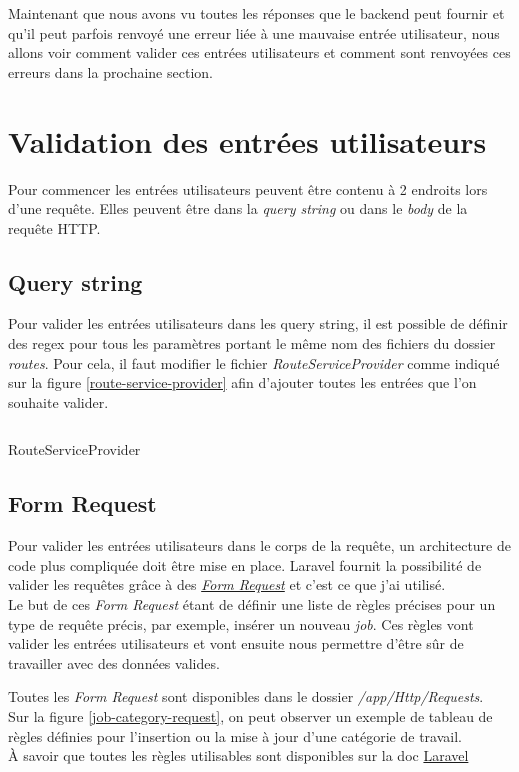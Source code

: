 \documentclass[
    iai, %
    il, %
]{heig-tb}
\begin{document}
Maintenant que nous avons vu toutes les réponses que le \Gls{backend} peut fournir et qu'il peut parfois renvoyé une erreur liée à une mauvaise entrée utilisateur, nous allons voir comment valider ces entrées utilisateurs et comment sont renvoyées ces erreurs dans la prochaine section.

\section{Validation des entrées utilisateurs}
Pour commencer les entrées utilisateurs peuvent être contenu à 2 endroits lors d'une requête. Elles peuvent être dans la \emph{query string} ou dans le \emph{body} de la requête HTTP.

\subsection{Query string}
Pour valider les entrées utilisateurs dans les query string, il est possible de définir des \Gls{regex} pour tous les paramètres portant le même nom des fichiers du dossier \emph{routes}.
Pour cela, il faut modifier le fichier \emph{RouteServiceProvider} comme indiqué sur la figure \ref{route-service-provider} afin d'ajouter toutes les entrées que l'on souhaite valider.

\begin{listing}[h]
    \inputminted{php}{assets/code/RouteServiceProvider.php}
    \caption{RouteServiceProvider \label{route-service-provider}}
\end{listing}

\subsection{Form Request}
Pour valider les entrées utilisateurs dans le corps de la requête, un architecture de code plus compliquée doit être mise en place. Laravel fournit la possibilité de valider les requêtes grâce à des \href{https://laravel.com/docs/9.x/validation#form-request-validation}{\emph{Form Request}} et c'est ce que j'ai utilisé. \\
Le but de ces \emph{Form Request} étant de définir une liste de règles précises pour un type de requête précis, par exemple, insérer un nouveau \emph{job}. Ces règles vont valider les entrées utilisateurs et vont ensuite nous permettre d'être sûr de travailler avec des données valides.

Toutes les \emph{Form Request} sont disponibles dans le dossier \emph{/app/Http/Requests}. \\
Sur la figure \ref{job-category-request}, on peut observer un exemple de tableau de règles définies pour l'insertion ou la mise à jour d'une catégorie de travail. \\
À savoir que toutes les règles utilisables sont disponibles sur la doc \href{https://laravel.com/docs/9.x/validation#available-validation-rules}{Laravel}
\end{document}
